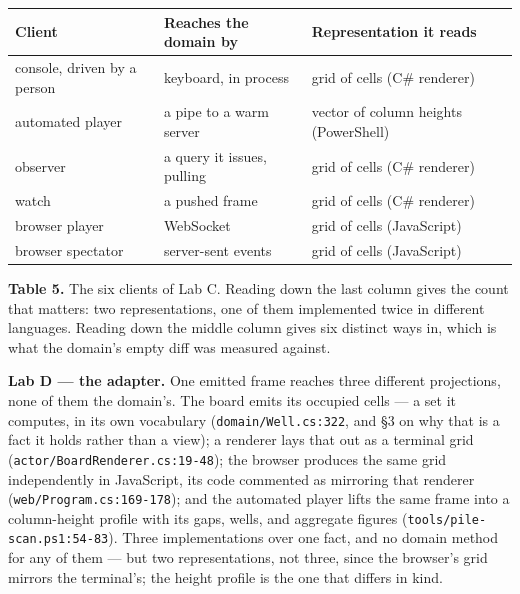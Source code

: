 \documentclass[
]{article}
\newcounter{none} %
\begin{document}
{\def\LTcaptype{none} %
\begin{longtable}[]{@{}
  >{\raggedright\arraybackslash}p{}
  >{\raggedright\arraybackslash}p{}
  >{\raggedright\arraybackslash}p{}@{}}
\toprule\noalign{}
\begin{minipage}[b]{\linewidth}\raggedright
Client
\end{minipage} & \begin{minipage}[b]{\linewidth}\raggedright
Reaches the domain by
\end{minipage} & \begin{minipage}[b]{\linewidth}\raggedright
Representation it reads
\end{minipage} \\
\midrule\noalign{}
\endhead
\bottomrule\noalign{}
\endlastfoot
console, driven by a person & keyboard, in process & grid of cells (C\#
renderer) \\
automated player & a pipe to a warm server & vector of column heights
(PowerShell) \\
observer & a query it issues, pulling & grid of cells (C\# renderer) \\
watch & a pushed frame & grid of cells (C\# renderer) \\
browser player & WebSocket & grid of cells (JavaScript) \\
browser spectator & server-sent events & grid of cells (JavaScript) \\
\end{longtable}
}

\textbf{Table 5.} The six clients of Lab C. Reading down the last column
gives the count that matters: two representations, one of them
implemented twice in different languages. Reading down the middle column
gives six distinct ways in, which is what the domain's empty diff was
measured against.

\textbf{Lab D --- the adapter.} One emitted frame reaches three
different projections, none of them the domain's. The board emits its
occupied cells --- a set it computes, in its own vocabulary
(\texttt{domain/Well.cs:322}, and §3 on why that is a fact it holds
rather than a view); a renderer lays that out as a terminal grid
(\texttt{actor/BoardRenderer.cs:19-48}); the browser produces the same
grid independently in JavaScript, its code commented as mirroring that
renderer (\texttt{web/Program.cs:169-178}); and the automated player
lifts the same frame into a column-height profile with its gaps, wells,
and aggregate figures (\texttt{tools/pile-scan.ps1:54-83}). Three
implementations over one fact, and no domain method for any of them ---
but two representations, not three, since the browser's grid mirrors the
terminal's; the height profile is the one that differs in kind.
\end{document}
